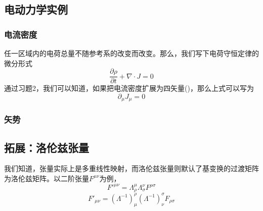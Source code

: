 \subsection{电动力学实例}
\subsubsection{电流密度}
任一区域内的电荷总量不随参考系的改变而改变。那么，我们写下电荷守恒定律的微分形式
\begin{equation}
\frac{\partial\rho}{\partial t}+\nabla \cdot J=0
\end{equation}
通过习题2，我们可以知道，如果把电流密度扩展为四矢量(\rho)，那么上式可以写为
\begin{equation}
\partial_\mu J_\mu=0
\end{equation}
\subsubsection{矢势}
\subsection{拓展：洛伦兹张量}
我们知道，张量实际上是多重线性映射，而洛伦兹张量则默认了基变换的过渡矩阵为洛伦兹矩阵。以二阶张量$F^{\mu\nu} $为例，
\begin{equation}
F'^{\mu\nu}=\Lambda_\rho^\mu \Lambda_\sigma^\nu F^{\rho\sigma}  
\end{equation}
\begin{equation}
F'_{\mu\nu}=(\Lambda^{-1})_\mu^\rho (\Lambda^{-1})_\nu^\sigma F_{\rho\sigma}
\end{equation}


